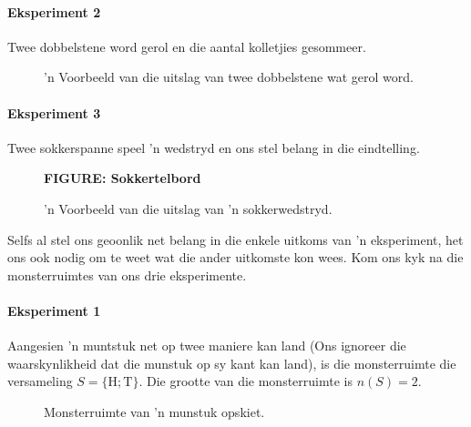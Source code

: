 \paragraph{Eksperiment 2} Twee dobbelstene word gerol en die aantal kolletjies gesommeer. 

\begin{figure}[h]
  \begin{center}
  \end{center}
  \caption{'n Voorbeeld van die uitslag van twee dobbelstene wat gerol word.}
\end{figure}

\paragraph{Eksperiment 3} Twee sokkerspanne speel 'n wedstryd en ons stel belang in die eindtelling.

\begin{figure}[h]
  \begin{center}
    \textbf{FIGURE: Sokkertelbord}
  \end{center}
  \caption{'n Voorbeeld van die uitslag van 'n sokkerwedstryd.}
\end{figure}


Selfs al stel ons geoonlik net belang in die enkele uitkoms van 'n eksperiment, het ons ook nodig om te weet wat die ander uitkomste kon wees. Kom ons kyk na die monsterruimtes van ons drie eksperimente.

\paragraph{Eksperiment 1} Aangesien 'n muntstuk net op twee maniere kan land (Ons ignoreer die waarskynlikheid dat die munstuk op sy kant kan land),  is die monsterruimte die versameling \(S=\{\textrm{H}; \textrm{T}\}\). Die grootte van die monsterruimte is \(n(S)=2\).

\begin{figure}[h]
  \begin{center}
  \end{center}
  \caption{Monsterruimte van 'n munstuk opskiet.}
\end{figure}


